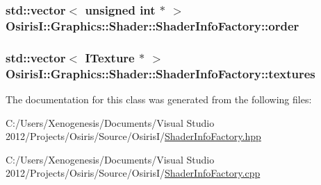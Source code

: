 \hypertarget{class_osiris_i_1_1_graphics_1_1_shader_1_1_shader_info_factory_a0dab22a3ea3c7a589767e946f7628b83}{
\subsubsection[{order}]{\setlength{\rightskip}{0pt plus 5cm}std\-::vector$<$ unsigned int $\ast$ $>$ Osiris\-I\-::\-Graphics\-::\-Shader\-::\-Shader\-Info\-Factory\-::order\hspace{0.3cm}{\ttfamily [static]}}}\label{class_osiris_i_1_1_graphics_1_1_shader_1_1_shader_info_factory_a0dab22a3ea3c7a589767e946f7628b83}
\hypertarget{class_osiris_i_1_1_graphics_1_1_shader_1_1_shader_info_factory_a6783c9b0dad63399d898c78ee08ffb7a}{
\subsubsection[{textures}]{\setlength{\rightskip}{0pt plus 5cm}std\-::vector$<$ I\-Texture $\ast$ $>$ Osiris\-I\-::\-Graphics\-::\-Shader\-::\-Shader\-Info\-Factory\-::textures\hspace{0.3cm}{\ttfamily [static]}}}\label{class_osiris_i_1_1_graphics_1_1_shader_1_1_shader_info_factory_a6783c9b0dad63399d898c78ee08ffb7a}


The documentation for this class was generated from the following files\-:\begin{DoxyCompactItemize}
\item 
C\-:/\-Users/\-Xenogenesis/\-Documents/\-Visual Studio 2012/\-Projects/\-Osiris/\-Source/\-Osiris\-I/\hyperlink{_shader_info_factory_8hpp}{Shader\-Info\-Factory.\-hpp}\item 
C\-:/\-Users/\-Xenogenesis/\-Documents/\-Visual Studio 2012/\-Projects/\-Osiris/\-Source/\-Osiris\-I/\hyperlink{_shader_info_factory_8cpp}{Shader\-Info\-Factory.\-cpp}\end{DoxyCompactItemize}
